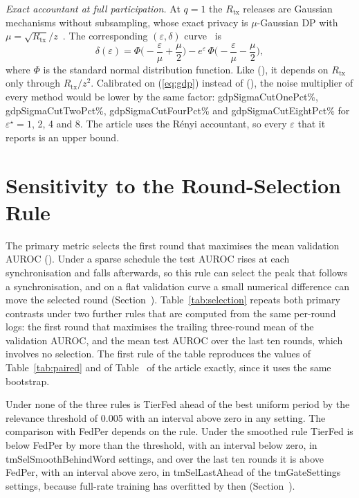 \documentclass[journal]{IEEEtran}
\newcommand{\tierfed}{TierFed}
\begin{document}
\emph{Exact accountant at full participation.} At $q=1$ the $R_{\mathrm{tx}}$ releases are Gaussian mechanisms without subsampling, whose exact privacy is $\mu$-Gaussian DP with $\mu=\sqrt{R_{\mathrm{tx}}}/z$~\cite{dong2022gdp}. The corresponding $(\varepsilon,\delta)$ curve~\cite{balle2018} is
\begin{equation}
\delta(\varepsilon)=\Phi\Big(-\frac{\varepsilon}{\mu}+\frac{\mu}{2}\Big)-e^{\varepsilon}\,\Phi\Big(-\frac{\varepsilon}{\mu}-\frac{\mu}{2}\Big),
\label{eq:gdp}
\end{equation}
where $\Phi$ is the standard normal distribution function. Like (), it depends on $R_{\mathrm{tx}}$ only through $R_{\mathrm{tx}}/z^2$. Calibrated on (\ref{eq:gdp}) instead of (), the noise multiplier of every method would be lower by the same factor: \num{gdpSigmaCutOnePct}\%, \num{gdpSigmaCutTwoPct}\%, \num{gdpSigmaCutFourPct}\% and \num{gdpSigmaCutEightPct}\% for $\varepsilon^\star=1$, 2, 4 and 8. The article uses the R\'enyi accountant, so every $\varepsilon$ that it reports is an upper bound.

\section{Sensitivity to the Round-Selection Rule}
\label{supp:selection}
The primary metric selects the first round that maximises the mean validation AUROC (). Under a sparse schedule the test AUROC rises at each synchronisation and falls afterwards, so this rule can select the peak that follows a synchronisation, and on a flat validation curve a small numerical difference can move the selected round (Section~). Table~\ref{tab:selection} repeats both primary contrasts under two further rules that are computed from the same per-round logs: the first round that maximises the trailing three-round mean of the validation AUROC, and the mean test AUROC over the last ten rounds, which involves no selection. The first rule of the table reproduces the values of Table~\ref{tab:paired} and of Table~ of the article exactly, since it uses the same bootstrap.

Under none of the three rules is \tierfed{} ahead of the best uniform period by the relevance threshold of 0.005 with an interval above zero in any setting. The comparison with FedPer depends on the rule. Under the smoothed rule \tierfed{} is below FedPer by more than the threshold, with an interval below zero, in \num{tmSelSmoothBehindWord} settings, and over the last ten rounds it is above FedPer, with an interval above zero, in \num{tmSelLastAhead} of the \num{tmGateSettings} settings, because full-rate training has overfitted by then (Section~).
\end{document}
